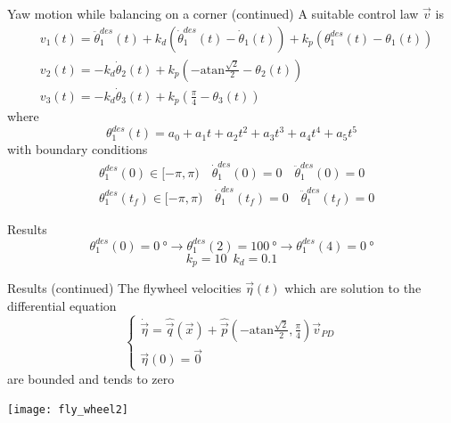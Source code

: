 \begin{frame}{Yaw motion while balancing on a corner (continued)}
  A suitable control law $\vec{v}$ is
  {\small
    \[
    \begin{split}
      &v_1(t) = \ddot{\theta}_1^{des}(t) + k_d(\dot{\theta}_1^{des}(t) - \dot{\theta}_1(t)) + k_p (\theta_1^{des}(t) - \theta_1(t))\\
      &v_2(t) = - k_d\dot{\theta}_2(t) + k_p \left(-\mathrm{atan}\frac{\sqrt{2}}{2} - \theta_2(t)\right)\\
      &v_3(t) = - k_d\dot{\theta}_3(t) + k_p \left(\frac{\pi}{4} - \theta_3(t)\right)
    \end{split}
    \]
  }
  where
  \[
  \theta_1^{des}(t) = a_0 + a_1 t + a_2 t^2 + a_3 t^3 + a_4 t^4 + a_5 t^5
  \]
  with boundary conditions
  \[
  \begin{split}
    &\theta_1^{des}(0) \in [-\pi, \pi) \quad \dot{\theta}_1^{des}(0)= 0 \quad \ddot{\theta}_1^{des}(0) = 0\\
      &\theta_1^{des}(t_{f}) \in [-\pi, \pi)  \quad \dot{\theta}_1^{des}(t_{f})= 0 \quad \ddot{\theta}_1^{des}(t_{f}) = 0
  \end{split}
  \]
\end{frame}

\begin{frame}{Results}
  \[\theta_1^{des}(0) = \SI{0}{\degree} \rightarrow \theta_1^{des}(2) = \SI{100}{\degree}
  \rightarrow \theta_1^{des}(4) = \SI{0}{\degree}\]
  \[k_p = 10 \enspace k_d = 0.1\]
  \begin{center}
  \end{center}
\end{frame}

\begin{frame}{Results (continued)}
  The flywheel velocities $\vec{\eta}(t)$ which are
  solution to the differential equation
  \[
  \begin{cases}
    \dot{\vec{\eta}} = \hat{\vec{q}}(\vec{x}) + \hat{\vec{p}}\left(-\mathrm{atan}\frac{\sqrt{2}}{2},\frac{\pi}{4}\right)\vec{v}_{PD}\\
    \vec{\eta}(0) = \vec{0}
  \end{cases}
  \]
  are bounded and tends to zero
  \par
  \centering
  \texttt{[image: fly\_wheel2]}
\end{frame}

